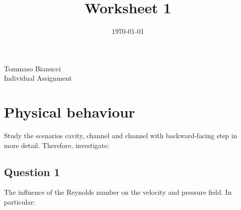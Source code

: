 \documentclass[11pt,a4paper,DIV12,pdftex]{scrartcl}
\title{Worksheet 1}
\date{\vspace*{-1cm}\today}
\author{}
\begin{document}
\maketitle
\begin{center}
	Tommaso Bianucci \\ Individual Assignment
\end{center}

\section{Physical behaviour}
\begin{shaded}
	Study the scenarios cavity, channel and channel with backward-facing step in more detail. Therefore, investigate:
\end{shaded}

\subsection{Question 1}
\begin{shaded}
	The influence of the Reynolds number on the velocity and pressure field. In particular:
\end{shaded}
\end{document}
